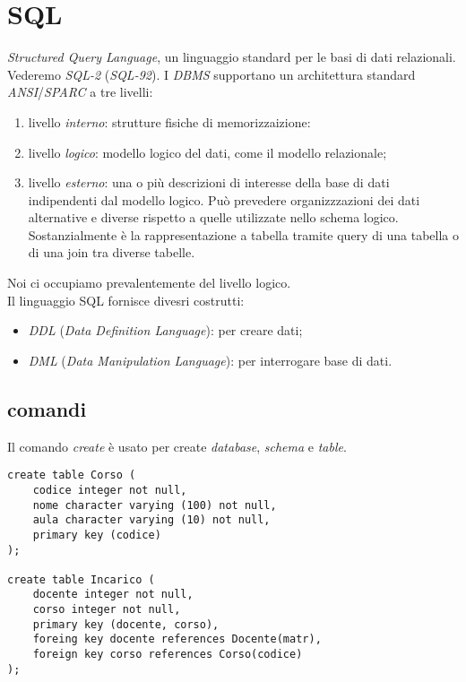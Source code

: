 \section{SQL}
\textit{Structured Query Language}, un linguaggio standard per le basi di dati relazionali. Vederemo \textit{SQL-2} (\textit{SQL-92}).
I \textit{DBMS} supportano un architettura standard \textit{ANSI}/\textit{SPARC} a tre livelli:
\begin{enumerate}
	\item livello \textit{interno}: strutture fisiche di memorizzaizione:
	\item livello \textit{logico}: modello logico del dati, come il modello relazionale;
	\item livello \textit{esterno}: una o più descrizioni di interesse della base di dati indipendenti dal modello logico. Può prevedere organizzzazioni dei dati alternative e diverse rispetto a quelle utilizzate nello schema logico. Sostanzialmente è la rappresentazione a tabella tramite query di una tabella o di una join tra diverse tabelle.
\end{enumerate}
Noi ci occupiamo prevalentemente del livello logico. \\
Il linguaggio SQL fornisce divesri costrutti:
\begin{itemize}
	\item \textit{DDL} (\textit{Data Definition Language}): per creare dati;
	\item \textit{DML} (\textit{Data Manipulation Language}): per interrogare base di dati.
\end{itemize}

\subsection{comandi}
Il comando \textit{create} è usato per create \textit{database}, \textit{schema} e \textit{table}.
\begin{lstlisting}
create table Corso (
	codice integer not null,
	nome character varying (100) not null,
	aula character varying (10) not null,
	primary key (codice)
);

create table Incarico (
	docente integer not null,
	corso integer not null,
	primary key (docente, corso),
	foreing key docente references Docente(matr),
	foreign key corso references Corso(codice)
);
\end{lstlisting}

